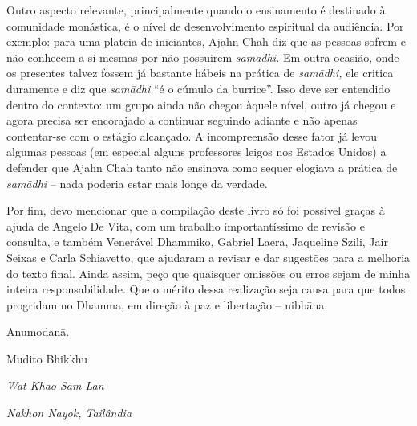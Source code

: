 Outro aspecto relevante, principalmente quando o ensinamento é
destinado à comunidade monástica, é o nível de desenvolvimento
espiritual da audiência. Por exemplo: para uma plateia de iniciantes,
Ajahn Chah diz que as pessoas sofrem e não conhecem a si mesmas por não
possuirem \textit{sam\=adhi. }Em outra ocasião, onde os presentes
talvez fossem já bastante hábeis na prática de \textit{sam\=adhi, }ele
critica duramente e diz que \textit{sam\=adhi }“é o cúmulo da burrice”.
Isso deve ser entendido dentro do contexto: um grupo ainda não chegou
àquele nível, outro já chegou e agora precisa ser encorajado a
continuar seguindo adiante e não apenas contentar-se com o estágio
alcançado. A incompreensão desse fator já levou algumas pessoas (em
especial alguns professores leigos nos Estados Unidos) a defender que
Ajahn Chah tanto não ensinava como sequer elogiava a prática de
\textit{sam\=adhi} – nada poderia estar mais longe da verdade.

Por fim, devo mencionar que a compilação deste livro só foi possível
graças à ajuda de Angelo De Vita, com um trabalho importantíssimo de
revisão e consulta, e também Venerável Dhammiko, Gabriel Laera,
Jaqueline Szili, Jair Seixas e Carla Schiavetto, que ajudaram a revisar
e dar sugestões para a melhoria do texto final. Ainda assim, peço que
quaisquer omissões ou erros sejam de minha inteira responsabilidade.
Que o mérito dessa realização seja causa para que todos progridam no
Dhamma, em direção à paz e libertação – nibb\=ana. 

Anumodan\=a.

Mudito Bhikkhu

\textit{Wat Khao Sam Lan}

{\itshape
Nakhon Nayok, Tailândia}


